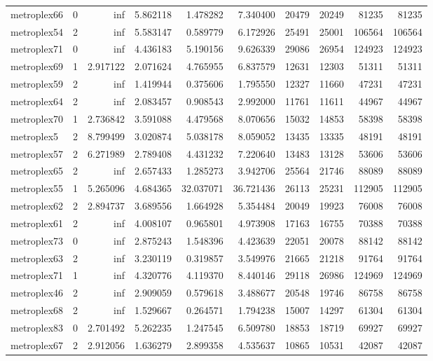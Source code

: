 \begin{longtable}{|l|r|r|r|r|r|r|r|r|r|}
metroplex66 & 0 & inf & 5.862118 & 1.478282 & 7.340400 & 20479 & 20249 & 81235 & 81235 \\
metroplex54 & 2 & inf & 5.583147 & 0.589779 & 6.172926 & 25491 & 25001 & 106564 & 106564 \\
metroplex71 & 0 & inf & 4.436183 & 5.190156 & 9.626339 & 29086 & 26954 & 124923 & 124923 \\
metroplex69 & 1 & 2.917122 & 2.071624 & 4.765955 & 6.837579 & 12631 & 12303 & 51311 & 51311 \\
metroplex59 & 2 & inf & 1.419944 & 0.375606 & 1.795550 & 12327 & 11660 & 47231 & 47231 \\
metroplex64 & 2 & inf & 2.083457 & 0.908543 & 2.992000 & 11761 & 11611 & 44967 & 44967 \\
metroplex70 & 1 & 2.736842 & 3.591088 & 4.479568 & 8.070656 & 15032 & 14853 & 58398 & 58398 \\
metroplex5 & 2 & 8.799499 & 3.020874 & 5.038178 & 8.059052 & 13435 & 13335 & 48191 & 48191 \\
metroplex57 & 2 & 6.271989 & 2.789408 & 4.431232 & 7.220640 & 13483 & 13128 & 53606 & 53606 \\
metroplex65 & 2 & inf & 2.657433 & 1.285273 & 3.942706 & 25564 & 21746 & 88089 & 88089 \\
metroplex55 & 1 & 5.265096 & 4.684365 & 32.037071 & 36.721436 & 26113 & 25231 & 112905 & 112905 \\
metroplex62 & 2 & 2.894737 & 3.689556 & 1.664928 & 5.354484 & 20049 & 19923 & 76008 & 76008 \\
metroplex61 & 2 & inf & 4.008107 & 0.965801 & 4.973908 & 17163 & 16755 & 70388 & 70388 \\
metroplex73 & 0 & inf & 2.875243 & 1.548396 & 4.423639 & 22051 & 20078 & 88142 & 88142 \\
metroplex63 & 2 & inf & 3.230119 & 0.319857 & 3.549976 & 21665 & 21218 & 91764 & 91764 \\
metroplex71 & 1 & inf & 4.320776 & 4.119370 & 8.440146 & 29118 & 26986 & 124969 & 124969 \\
metroplex46 & 2 & inf & 2.909059 & 0.579618 & 3.488677 & 20548 & 19746 & 86758 & 86758 \\
metroplex68 & 2 & inf & 1.529667 & 0.264571 & 1.794238 & 15007 & 14297 & 61304 & 61304 \\
metroplex83 & 0 & 2.701492 & 5.262235 & 1.247545 & 6.509780 & 18853 & 18719 & 69927 & 69927 \\
metroplex67 & 2 & 2.912056 & 1.636279 & 2.899358 & 4.535637 & 10865 & 10531 & 42087 & 42087 \\

\end{longtable}
